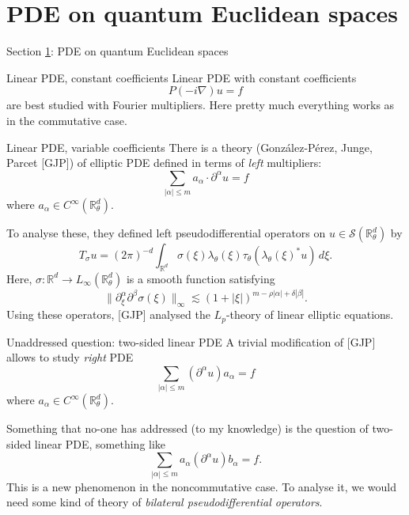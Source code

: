 \documentclass{beamer}
\numberwithin{equation}{section}
\theoremstyle{plain}
\theoremstyle{plain}
\theoremstyle{definition}
\theoremstyle{plain}
\theoremstyle{plain}
\theoremstyle{definition}
\newcommand{\Rl}{\mathbb{R}}
\newcommand{\Sc}{\mathcal{S}}
\begin{document}
\section{PDE on quantum Euclidean spaces}\label{pde_section}

\begin{frame}
    \Huge{Section \ref{pde_section}: PDE on quantum Euclidean spaces}
\end{frame}

\begin{frame}{Linear PDE, constant coefficients}
    Linear PDE with constant coefficients
    \[
        P(-i\nabla)u = f
    \]
    are best studied with Fourier multipliers. Here pretty much everything works as in the commutative case.
\end{frame}

\begin{frame}{Linear PDE, variable coefficients}
    There is a theory (Gonz\'{a}lez-P\'{e}rez, Junge, Parcet [GJP]) of elliptic PDE defined in terms of \emph{left} multipliers:
    \[
        \sum_{|\alpha|\leq m} a_{\alpha} \cdot \partial^{\alpha}u = f
    \]
    where $a_{\alpha}\in C^\infty(\Rl^d_\theta).$

    \pause To analyse these, they defined left pseudodifferential operators on $u\in \Sc(\Rl^d_\theta)$ by
    \[
        T_{\sigma}u = (2\pi)^{-d}\int_{\Rl^d} \sigma(\xi)\lambda_\theta(\xi)\tau_\theta(\lambda_\theta(\xi)^*u)\,d\xi.
    \]
    Here, $\sigma:\Rl^d\to L_{\infty}(\Rl^d_\theta)$ is a smooth function satisfying
    \[
        \|\partial_{\xi}^{\alpha}\partial^\beta \sigma(\xi)\|_{\infty} \lesssim (1+|\xi|)^{m-\rho|\alpha|+\delta |\beta|}.
    \]
    \pause
    Using these operators, [GJP] analysed the $L_p$-theory of linear elliptic equations.
\end{frame}

\begin{frame}{Unaddressed question: two-sided linear PDE}
    A trivial modification of [GJP] allows to study \emph{right} PDE
    \[
        \sum_{|\alpha|\leq m} (\partial^{\alpha}u)a_{\alpha} = f
    \]
    where $a_{\alpha}\in C^\infty(\Rl^d_\theta).$

    Something that no-one has addressed (to my knowledge) is the question of two-sided linear PDE, something like
    \[
        \sum_{|\alpha|\leq m} a_{\alpha}(\partial^{\alpha}u)b_{\alpha} = f.
    \]
    This is a new phenomenon in the noncommutative case.\pause
    To analyse it, we would need some kind of theory of \emph{bilateral pseudodifferential operators}.
\end{frame}
\end{document}
